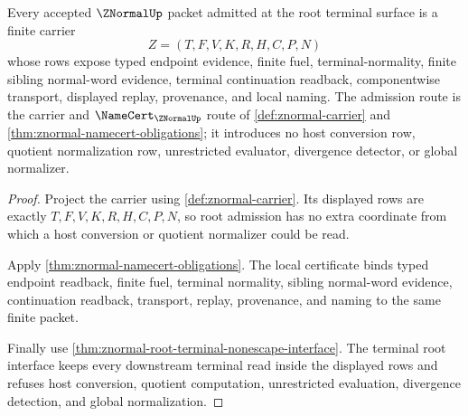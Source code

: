 \begin{theorem}
\label{thm:znormal-root-terminal-carrier-admission}
Every accepted $\ZNormalUp$ packet admitted at the root terminal surface is a finite carrier
$$
Z=(T,F,V,K,R,H,C,P,N)
$$
whose rows expose typed endpoint evidence, finite fuel, terminal-normality, finite sibling normal-word evidence, terminal continuation readback, componentwise transport, displayed replay, provenance, and local naming. The admission route is the carrier and $\NameCert_{\ZNormalUp}$ route of \autoref{def:znormal-carrier} and \autoref{thm:znormal-namecert-obligations}; it introduces no host conversion row, quotient normalization row, unrestricted evaluator, divergence detector, or global normalizer.
\end{theorem}
\begin{proof}
Project the carrier using \autoref{def:znormal-carrier}. Its displayed rows are exactly $T,F,V,K,R,H,C,P,N$, so root admission has no extra coordinate from which a host conversion or quotient normalizer could be read.

Apply \autoref{thm:znormal-namecert-obligations}. The local certificate binds typed endpoint readback, finite fuel, terminal normality, sibling normal-word evidence, continuation readback, transport, replay, provenance, and naming to the same finite packet.

Finally use \autoref{thm:znormal-root-terminal-nonescape-interface}. The terminal root interface keeps every downstream terminal read inside the displayed rows and refuses host conversion, quotient computation, unrestricted evaluation, divergence detection, and global normalization.
\end{proof}

